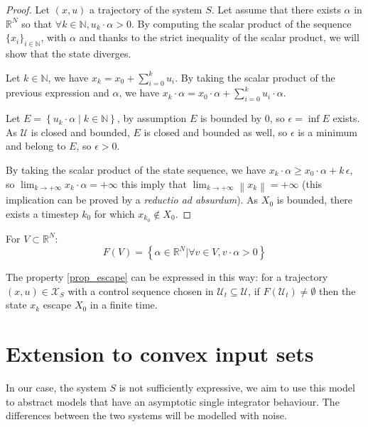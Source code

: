 \begin{proof}
Let $(x,u)$ a trajectory of the system $S$.
Let assume that there exists $\alpha$ in $\mathbb{R}^N$ so that $\forall k \in \mathbb{N}, u_k \cdot \alpha > 0$.
By computing the scalar product of the sequence $\{x_i \}_{i \in \mathbb{N}}$, with $\alpha$ and thanks to the strict inequality of the scalar product, we will show that the state diverges.

Let $k \in \mathbb{N}$, we have $x_{k} = x_0 + \sum_{i=0}^{k} u_i$.
By taking the scalar product of the previous expression and $\alpha$, we have $x_k \cdot \alpha = x_0 \cdot \alpha + \sum_{i=0}^{k} u_i \cdot \alpha$.
 
Let $E = \left \{ u_k \cdot \alpha \mid k \in \mathbb{N} \right \}$, by assumption $E$ is bounded by 0, so $\epsilon  = \inf E$ exists. As $\mathcal{U}$ is closed and bounded, $E$ is closed and bounded as well, so $\epsilon$ is a minimum and belong to $E$, so $\epsilon > 0$.

By taking the scalar product of the state sequence, we have $x_k \cdot \alpha \geq x_0 \cdot \alpha + k \, \epsilon$, so $\lim_{k \rightarrow + \infty} x_k \cdot \alpha = +\infty$ this imply that $\lim_{k \rightarrow + \infty} \left \| x_k \right \| = +\infty$ (this implication can be proved by a \textit{reductio ad absurdum}).
As $X_0$ is bounded, there exists a timestep $k_0$ for which $x_{k_0} \notin X_0$.
\end{proof}

For $V \subset \mathbb{R}^N$:
$$F(V) = \left \{ \alpha \in \mathbb{R}^N| \forall v \in V, v \cdot \alpha >0 \right \}$$

The property \ref{prop_escape} can be expressed in this way: for a trajectory $(x,u) \in \mathcal{X}_S$ with a control sequence chosen in $\mathcal{U}_t \subseteq \mathcal{U}$, if $F(\mathcal{U}_t) \neq \emptyset$ then the state $x_k$ escape $X_0$ in a finite time.

\section{Extension to convex input sets}\label{sec_ext_escape}

In our case, the system $S$ is not sufficiently expressive, 
we aim to use this model to abstract models that have an asymptotic single integrator behaviour.
The differences between the two systems will be modelled with noise.


